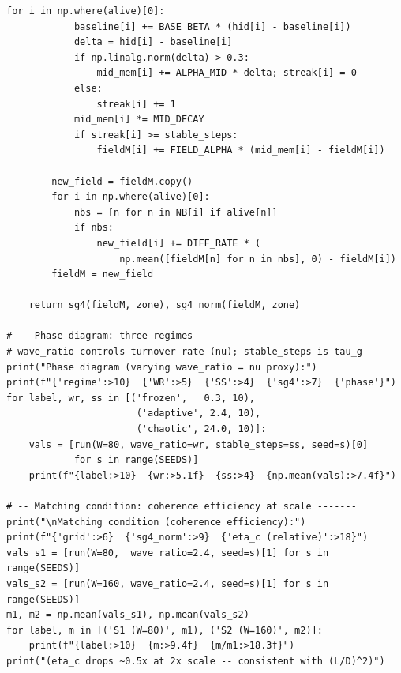 \documentclass[11pt]{article}
\begin{document}
\begin{lstlisting}[caption={paper5\_phases\_repro.py}]
        for i in np.where(alive)[0]:
            baseline[i] += BASE_BETA * (hid[i] - baseline[i])
            delta = hid[i] - baseline[i]
            if np.linalg.norm(delta) > 0.3:
                mid_mem[i] += ALPHA_MID * delta; streak[i] = 0
            else:
                streak[i] += 1
            mid_mem[i] *= MID_DECAY
            if streak[i] >= stable_steps:
                fieldM[i] += FIELD_ALPHA * (mid_mem[i] - fieldM[i])

        new_field = fieldM.copy()
        for i in np.where(alive)[0]:
            nbs = [n for n in NB[i] if alive[n]]
            if nbs:
                new_field[i] += DIFF_RATE * (
                    np.mean([fieldM[n] for n in nbs], 0) - fieldM[i])
        fieldM = new_field

    return sg4(fieldM, zone), sg4_norm(fieldM, zone)

# -- Phase diagram: three regimes ----------------------------
# wave_ratio controls turnover rate (nu); stable_steps is tau_g
print("Phase diagram (varying wave_ratio = nu proxy):")
print(f"{'regime':>10}  {'WR':>5}  {'SS':>4}  {'sg4':>7}  {'phase'}")
for label, wr, ss in [('frozen',   0.3, 10),
                       ('adaptive', 2.4, 10),
                       ('chaotic', 24.0, 10)]:
    vals = [run(W=80, wave_ratio=wr, stable_steps=ss, seed=s)[0]
            for s in range(SEEDS)]
    print(f"{label:>10}  {wr:>5.1f}  {ss:>4}  {np.mean(vals):>7.4f}")

# -- Matching condition: coherence efficiency at scale -------
print("\nMatching condition (coherence efficiency):")
print(f"{'grid':>6}  {'sg4_norm':>9}  {'eta_c (relative)':>18}")
vals_s1 = [run(W=80,  wave_ratio=2.4, seed=s)[1] for s in range(SEEDS)]
vals_s2 = [run(W=160, wave_ratio=2.4, seed=s)[1] for s in range(SEEDS)]
m1, m2 = np.mean(vals_s1), np.mean(vals_s2)
for label, m in [('S1 (W=80)', m1), ('S2 (W=160)', m2)]:
    print(f"{label:>10}  {m:>9.4f}  {m/m1:>18.3f}")
print("(eta_c drops ~0.5x at 2x scale -- consistent with (L/D)^2)")
\end{lstlisting}
\end{document}

